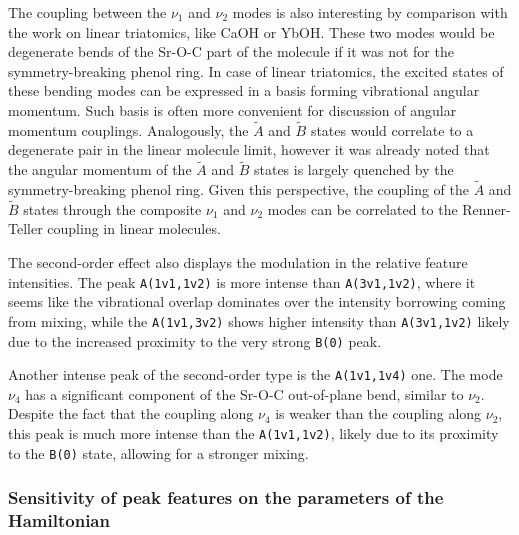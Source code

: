 \documentclass{article}
\begin{document}
The coupling between the $\nu _1$ and $\nu _2$ modes is also interesting by
comparison with the work on linear triatomics, like CaOH or YbOH. These two
modes would be degenerate bends of the Sr-O-C part of the molecule if it was
not for the symmetry-breaking phenol ring. In case of linear triatomics, the
excited states of these bending modes can be expressed in a basis forming
vibrational angular momentum. Such basis is often more convenient for
discussion of angular momentum
couplings.\autocite{pilgramProductionCharacterizationYtterbium2022}
Analogously, the $\tilde{A}$ and $\tilde{B}$ states would correlate to a
degenerate pair in the linear molecule limit, however it was already noted that
the angular momentum of the $\tilde{A}$ and $\tilde{B}$ states is largely
quenched by the symmetry-breaking phenol ring.\autocite{Augenbraun:CaOPh:2022}
Given this perspective, the coupling of the $\tilde{A}$ and $\tilde{B}$ states
through the composite $\nu _1$ and $\nu _2$ modes can be correlated to the
Renner-Teller coupling in linear molecules. 

The second-order effect also displays the modulation in the relative feature
intensities. The peak \texttt{A(1v1,1v2)} is more intense than
\texttt{A(3v1,1v2)}, where it seems like the vibrational overlap dominates over
the intensity borrowing coming from mixing, while the \texttt{A(1v1,3v2)}
shows higher intensity than \texttt{A(3v1,1v2)} likely due to the increased
proximity to the very strong \texttt{B(0)} peak. 

Another intense peak of the second-order type is the \texttt{A(1v1,1v4)} one.
The mode $\nu _4$ has a significant component of the Sr-O-C out-of-plane bend,
similar to $\nu _2$. Despite the fact that the coupling along $\nu _4$ is
weaker than the coupling along $\nu _2$, this peak is much more intense than
the \texttt{A(1v1,1v2)}, likely due to its proximity to the \texttt{B(0)}
state, allowing for a stronger mixing.

\subsubsection{Sensitivity of peak features on the parameters of the
Hamiltonian}
\label{sec:results:simulations:gap}
\end{document}
